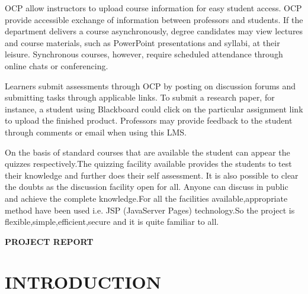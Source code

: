 OCP allow instructors to upload course information for easy student access.  OCP  provide accessible exchange of information between professors and students. If the department delivers a course asynchronously, degree candidates may view lectures and course materials, such as PowerPoint presentations and syllabi, at their leisure. Synchronous courses, however, require scheduled attendance through online chats or conferencing.

Learners submit  assessments through OCP by posting on discussion forums and submitting tasks through applicable links. To submit a research paper, for instance, a student using Blackboard could click on the particular assignment link to upload the finished product. Professors may provide feedback to the student through comments or email when using this LMS.

 On the basis of standard courses that  are available the student can appear the quizzes respectively.The quizzing facility available provides the students to test their knowledge and further does their self assessment. It is also possible to clear the doubts as the discussion facility open for all. Anyone can discuss in public and achieve the complete knowledge.For all the facilities available,appropriate method have been used i.e. JSP (JavaServer Pages) technology.So the project is flexible,simple,efficient,secure and it is quite familiar to all.


%
%
%
\clearpage
{}
\tableofcontents
%
%
\clearpage
{}
\listoftables
%
%

\clearpage
{}
\listoffigures
%
%
\mainmatter
%
\clearpage
\quad\vfill
\begin{center}
{\Huge \bf PROJECT REPORT}
\end{center}
\vfill
\clearpage
%
%
% 
%
%
%  
\chapter{INTRODUCTION}
%
